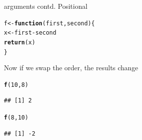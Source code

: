\documentclass{beamer}\usepackage[]{graphicx}\usepackage[]{color}
\makeatletter
\newcommand{\hlnum}[1]{\textcolor[rgb]{0.686,0.059,0.569}{#1}}%
\newcommand{\hlopt}[1]{\textcolor[rgb]{0,0,0}{#1}}%
\newcommand{\hlstd}[1]{\textcolor[rgb]{0.345,0.345,0.345}{#1}}%
\newcommand{\hlkwa}[1]{\textcolor[rgb]{0.161,0.373,0.58}{\textbf{#1}}}%
\newcommand{\hlkwb}[1]{\textcolor[rgb]{0.69,0.353,0.396}{#1}}%
\newcommand{\hlkwc}[1]{\textcolor[rgb]{0.333,0.667,0.333}{#1}}%
\newcommand{\hlkwd}[1]{\textcolor[rgb]{0.737,0.353,0.396}{\textbf{#1}}}%
\newenvironment{kframe}{%
 \def\at@end@of@kframe{}%
 \ifinner\ifhmode%
  \def\at@end@of@kframe{\end{minipage}}%
  \begin{minipage}{\columnwidth}%
 \fi\fi%
 \def\FrameCommand##1{\hskip\@totalleftmargin \hskip-\fboxsep
 \colorbox{shadecolor}{##1}\hskip-\fboxsep
     \hskip-\linewidth \hskip-\@totalleftmargin \hskip\columnwidth}%
 \MakeFramed {\advance\hsize-\width
   \@totalleftmargin\z@ \linewidth\hsize
   \@setminipage}}%
 {\par\unskip\endMakeFramed%
 \at@end@of@kframe}
\newenvironment{knitrout}{}{} %
\makeatother
\begin{document}
\begin{frame}[fragile]{arguments contd.}
Positional
\linebreak
\begin{knitrout}
\color{fgcolor}\begin{kframe}
\begin{alltt}
\hlstd{f} \hlkwb{<-} \hlkwa{function}\hlstd{(}\hlkwc{first}\hlstd{,} \hlkwc{second}\hlstd{)\{}
    \hlstd{x} \hlkwb{<-} \hlstd{first} \hlopt{-} \hlstd{second}
    \hlkwd{return}\hlstd{(x)}
\hlstd{\}}
\end{alltt}
\end{kframe}
\end{knitrout}
Now if we swap the order, the results change
\begin{knitrout}
\color{fgcolor}\begin{kframe}
\begin{alltt}
\hlkwd{f}\hlstd{(}\hlnum{10}\hlstd{,} \hlnum{8}\hlstd{)}
\end{alltt}
\begin{verbatim}
## [1] 2
\end{verbatim}
\begin{alltt}
\hlkwd{f}\hlstd{(}\hlnum{8}\hlstd{,} \hlnum{10}\hlstd{)}
\end{alltt}
\begin{verbatim}
## [1] -2
\end{verbatim}
\end{kframe}
\end{knitrout}
\end{frame}
\end{document}
